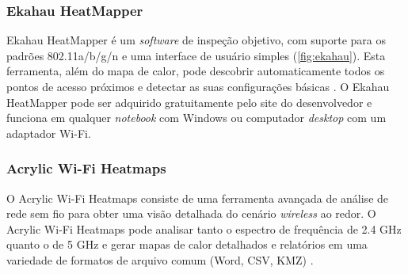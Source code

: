 \subsubsection{Ekahau HeatMapper}
\label{subsubsec:ekahau}

Ekahau HeatMapper é um \textit{software} de inspeção objetivo, com suporte para os padrões 802.11a/b/g/n e uma interface de usuário simples (\autoref{fig:ekahau}). Esta ferramenta, além do mapa de calor, pode descobrir automaticamente todos os pontos de acesso próximos e detectar as suas configurações básicas \cite{Ekahau2019}. O Ekahau HeatMapper pode ser adquirido gratuitamente pelo site do desenvolvedor e funciona em qualquer \textit{notebook} com Windows ou computador \textit{desktop} com um adaptador Wi-Fi.

\begin{figure}[H]
	\centering
\end{figure}

\subsubsection{Acrylic Wi-Fi Heatmaps}
\label{subsubsec:acrylic-wifi-heatmaps}

O Acrylic Wi-Fi Heatmaps consiste de uma ferramenta avançada de análise de rede sem fio para obter uma visão detalhada do cenário \textit{wireless} ao redor. O Acrylic Wi-Fi Heatmaps pode analisar tanto o espectro de frequência de 2.4 GHz quanto o de 5 GHz e gerar mapas de calor detalhados e relatórios em uma variedade de formatos de arquivo comum (Word, CSV, KMZ) \cite{Netspot2019}. 

